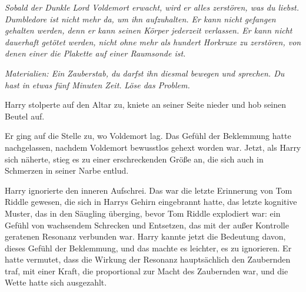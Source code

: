 

\emph{Sobald der Dunkle Lord Voldemort erwacht, wird er alles zerstören, was du liebst. Dumbledore ist nicht mehr da, um ihn aufzuhalten. Er kann nicht gefangen gehalten werden, denn er kann seinen Körper jederzeit verlassen. Er kann nicht dauerhaft getötet werden, nicht ohne mehr als hundert Horkruxe zu zerstören, von denen einer die Plakette auf einer Raumsonde ist.}

\emph{Materialien: Ein Zauberstab, du darfst ihn diesmal bewegen und sprechen. Du hast in etwas fünf Minuten Zeit.}
\emph{Löse das Problem.}

Harry stolperte auf den Altar zu, kniete an seiner Seite nieder und hob seinen Beutel auf.

Er ging auf die Stelle zu, wo Voldemort lag. Das Gefühl der Beklemmung hatte nachgelassen, nachdem Voldemort bewusstlos gehext worden war. Jetzt, als Harry sich näherte, stieg es zu einer erschreckenden Größe an, die sich auch in Schmerzen in seiner Narbe entlud.

Harry ignorierte den inneren Aufschrei. Das war die letzte Erinnerung von Tom Riddle gewesen, die sich in Harrys Gehirn eingebrannt hatte, das letzte kognitive Muster, das in den Säugling überging, bevor Tom Riddle explodiert war: ein Gefühl von wachsendem Schrecken und Entsetzen, das mit der außer Kontrolle geratenen Resonanz verbunden war. Harry kannte jetzt die Bedeutung davon, dieses Gefühl der Beklemmung, und das machte es leichter, es zu ignorieren. Er hatte vermutet, dass die Wirkung der Resonanz hauptsächlich den Zaubernden traf, mit einer Kraft, die proportional zur Macht des Zaubernden war, und die Wette hatte sich ausgezahlt.

